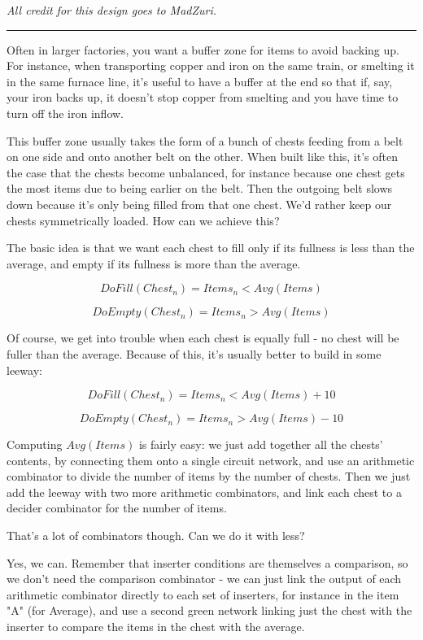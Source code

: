 \documentclass{article}
\begin{document}
\emph{All credit for this design goes to MadZuri.}

\rule{10cm}{1pt}

Often in larger factories, you want a buffer zone for items to avoid backing up. For instance, when transporting copper and iron on the same train, or smelting it in the same furnace line, it's useful to have a buffer at the end so that if, say, your iron backs up, it doesn't stop copper from smelting and you have time to turn off the iron inflow.

This buffer zone usually takes the form of a bunch of chests feeding from a belt on one side and onto another belt on the other. When built like this, it's often the case that the chests become unbalanced, for instance because one chest gets the most items due to being earlier on the belt. Then the outgoing belt slows down because it's only being filled from that one chest. We'd rather keep our chests symmetrically loaded. How can we achieve this?

The basic idea is that we want each chest to fill only if its fullness is less than the average, and empty if its fullness is more than the average.

$$ DoFill(Chest_n) = Items_n \lt Avg(Items)$$

$$ DoEmpty(Chest_n) = Items_n \gt Avg(Items)$$

Of course, we get into trouble when each chest is equally full - no chest will be fuller than the average. Because of this, it's usually better to build in some leeway:

$$DoFill(Chest_n) = Items_n \lt Avg(Items) + 10$$

$$DoEmpty(Chest_n) = Items_n \gt Avg(Items) - 10$$

Computing $Avg(Items)$ is fairly easy: we just add together all the chests' contents, by connecting them
onto a single circuit network, and use an arithmetic combinator to divide the number of items by the number of chests. Then we just add the leeway with two more arithmetic combinators, and link each chest to a decider combinator for the number of items.

That's a lot of combinators though. Can we do it with less?

Yes, we can. Remember that inserter conditions are themselves a comparison, so we don't need the comparison combinator - we can just link the output of each arithmetic combinator directly to each set of inserters, for instance in the item "A" (for Average), and use a second green network linking just the chest with the inserter to compare the items in the chest with the average.
\end{document}
